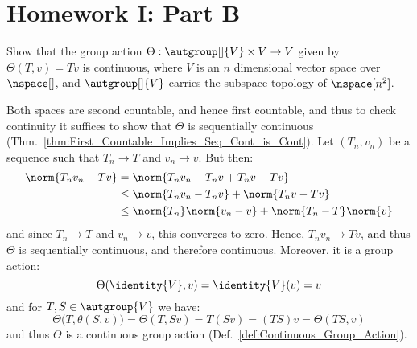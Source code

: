 \documentclass{article}                                                        %
\begin{document}
    \section{Homework I: Part B}
        \begin{problem}
            Show that the group action
            $\Theta:\autgroup[]{V}\times{V}\rightarrow{V}$ given by
            $\Theta(T,v)=Tv$ is continuous, where $V$ is an $n$ dimensional
            vector space over $\nspace[]$, and $\autgroup[]{V}$ carries the
            subspace topology of $\nspace[n^{2}]$.
        \end{problem}
        \begin{solution}
            Both spaces are second countable, and hence first countable, and
            thus to check continuity it suffices to show that $\Theta$ is
            sequentially continuous
            (Thm.~\ref{thm:First_Countable_Implies_Seq_Cont_is_Cont}).
            Let $(T_{n},v_{n})$ be a sequence such that
            $T_{n}\rightarrow{T}$ and $v_{n}\rightarrow{v}$. But then:
            \begin{subequations}
                \begin{align}
                    \norm{T_{n}v_{n}-Tv}&=\norm{T_{n}v_{n}-T_{n}v+T_{n}v-Tv}\\
                    &\leq\norm{T_{n}v_{n}-T_{n}v}+\norm{T_{n}v-Tv}\\
                    &\leq\norm{T_{n}}\norm{v_{n}-v}+\norm{T_{n}-T}\norm{v}
                \end{align}
            \end{subequations}
            and since $T_{n}\rightarrow{T}$ and $v_{n}\rightarrow{v}$, this
            converges to zero. Hence, $T_{n}v_{n}\rightarrow{T}v$, and thus
            $\Theta$ is sequentially continuous, and therefore continuous.
            Moreover, it is a group action:
            \begin{equation}
                \Theta(\identity{V},v)=\identity{V}(v)=v
            \end{equation}
            and for $T,S\in\autgroup{V}$ we have:
            \begin{equation}
                \Theta\big(T,\theta(S,v)\big)=\Theta(T,Sv)
                =T(Sv)=(TS)v=\Theta(TS,v)
            \end{equation}
            and thus $\Theta$ is a continuous group action
            (Def.~\ref{def:Continuous_Group_Action}).
        \end{solution}
\end{document}
